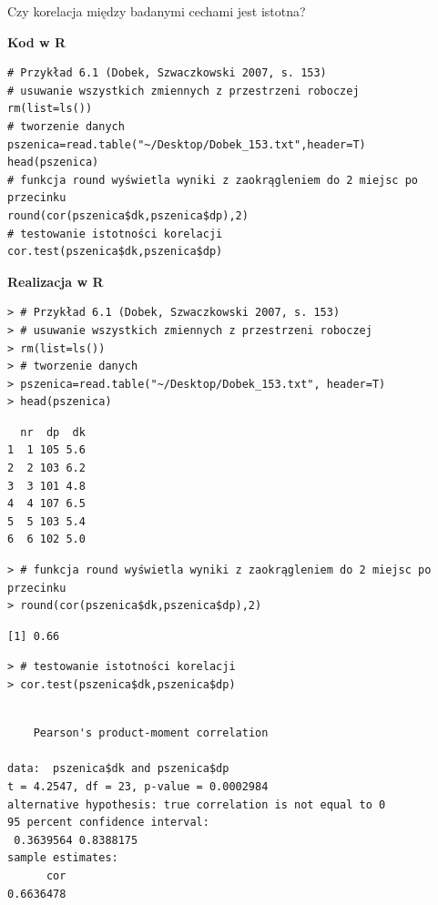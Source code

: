 \documentclass[12pt,B5paper,]{book}
\begin{document}
Czy korelacja między badanymi cechami jest istotna?

\vspace{0.8cm} \textbf{Kod w R}

\begin{verbatim}
# Przykład 6.1 (Dobek, Szwaczkowski 2007, s. 153)
# usuwanie wszystkich zmiennych z przestrzeni roboczej
rm(list=ls()) 
# tworzenie danych
pszenica=read.table("~/Desktop/Dobek_153.txt",header=T)
head(pszenica)
# funkcja round wyświetla wyniki z zaokrągleniem do 2 miejsc po przecinku
round(cor(pszenica$dk,pszenica$dp),2)  
# testowanie istotności korelacji
cor.test(pszenica$dk,pszenica$dp)
\end{verbatim}

\newpage

\textbf{Realizacja w R}

\begin{verbatim}
> # Przykład 6.1 (Dobek, Szwaczkowski 2007, s. 153)
> # usuwanie wszystkich zmiennych z przestrzeni roboczej
> rm(list=ls()) 
> # tworzenie danych
> pszenica=read.table("~/Desktop/Dobek_153.txt", header=T)
> head(pszenica)
\end{verbatim}

\begin{verbatim}
  nr  dp  dk
1  1 105 5.6
2  2 103 6.2
3  3 101 4.8
4  4 107 6.5
5  5 103 5.4
6  6 102 5.0
\end{verbatim}

\begin{verbatim}
> # funkcja round wyświetla wyniki z zaokrągleniem do 2 miejsc po przecinku
> round(cor(pszenica$dk,pszenica$dp),2)  
\end{verbatim}

\begin{verbatim}
[1] 0.66
\end{verbatim}

\begin{verbatim}
> # testowanie istotności korelacji
> cor.test(pszenica$dk,pszenica$dp)
\end{verbatim}

\begin{verbatim}

    Pearson's product-moment correlation

data:  pszenica$dk and pszenica$dp
t = 4.2547, df = 23, p-value = 0.0002984
alternative hypothesis: true correlation is not equal to 0
95 percent confidence interval:
 0.3639564 0.8388175
sample estimates:
      cor 
0.6636478 
\end{verbatim}
\end{document}
